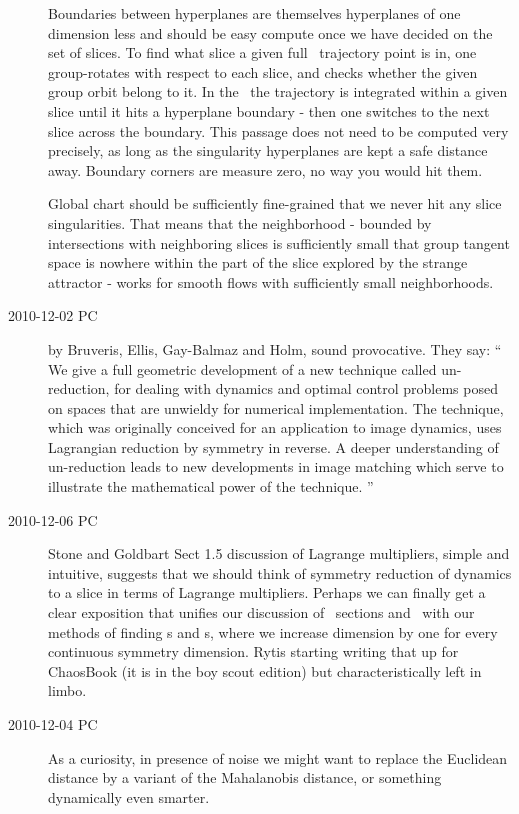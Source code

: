 \begin{description}
Boundaries
between hyperplanes are themselves hyperplanes of one dimension less and
should be easy compute once we have decided on the set of slices. To find
what slice a given full \statesp\ trajectory point is in, one group-rotates
with respect to each slice, and checks whether the given group orbit
belong to it. In the \reducedsp\ the trajectory is integrated within a
given slice until it hits a hyperplane boundary - then one switches to
the next slice across the boundary. This passage does not need to
be computed very precisely, as long as the singularity
hyperplanes are kept a safe distance away. Boundary corners are measure zero, no
way you would hit them.

Global chart should be sufficiently fine-grained that we never hit any
slice singularities. That means that the neighborhood - bounded by
intersections with neighboring slices is sufficiently small that group
tangent space is nowhere within the part of the slice explored by
the strange attractor - works for smooth flows
with sufficiently small neighborhoods.

\item[2010-12-02 PC]
by Bruveris, Ellis, Gay-Balmaz and Holm,
sound provocative. They say: ``
We give a full geometric development of a new technique called
un-reduction, for dealing with dynamics and optimal control problems posed on
spaces that are unwieldy for numerical implementation. The technique, which was
originally conceived for an application to image dynamics, uses Lagrangian
reduction by symmetry in reverse. A deeper understanding of un-reduction leads
to new developments in image matching which serve to illustrate the
mathematical power of the technique.
''

\item[2010-12-06 PC]
{Stone and Goldbart} Sect 1.5 discussion of Lagrange
multipliers, simple and intuitive, suggests that we should think of
symmetry reduction of dynamics to a slice in terms of Lagrange
multipliers. Perhaps we can finally get a clear exposition that unifies
our discussion of \Poincare\ sections and \reducedsp\ with our methods of
finding \po s and \rpo s, where we increase dimension by one for every
continuous symmetry dimension. Rytis starting writing that up for
ChaosBook (it is in the boy scout edition) but characteristically left in
limbo.

\item[2010-12-04 PC]
As a curiosity, in presence of noise we might want to replace the Euclidean
distance by a variant of the
{Mahalanobis distance}, or something dynamically even
smarter.


\end{description}
